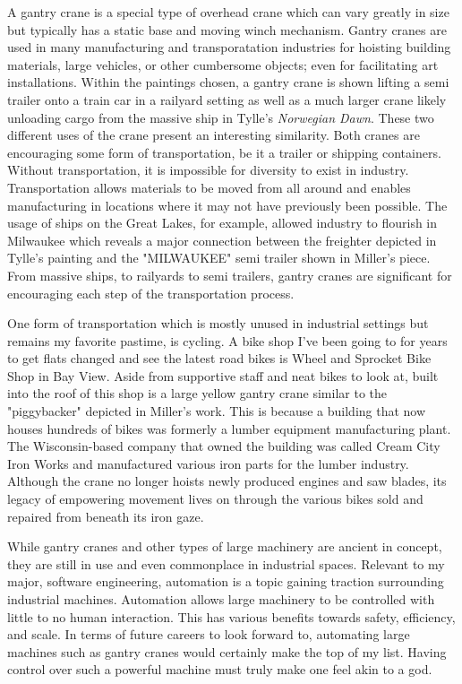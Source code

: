 \documentclass[12pt]{article}
\begin{document}
A gantry crane is a special type of overhead crane which can vary greatly in size but typically has a static base and moving winch mechanism.
Gantry cranes are used in many manufacturing and transporatation industries for hoisting building materials, large vehicles, or other cumbersome
objects; even for facilitating art installations. Within the paintings chosen, a gantry crane is shown lifting a semi trailer onto a train car
in a railyard setting as well as a much larger crane likely unloading cargo from the massive ship in Tylle's \textit{Norwegian Dawn}. These two different
uses of the crane present an interesting similarity. Both cranes are encouraging some form of transportation, be it a trailer or shipping containers. Without
transportation, it is impossible for diversity to exist in industry. Transportation allows materials to be moved from all around and enables manufacturing in
locations where it may not have previously been possible. The usage of ships on the Great Lakes, for example, allowed industry to flourish in Milwaukee which
reveals a major connection between the freighter depicted in Tylle's painting and the "MILWAUKEE" semi trailer shown in Miller's piece. From massive ships, to
railyards to semi trailers, gantry cranes are significant for encouraging each step of the transportation process. 

One form of transportation which is mostly unused in industrial settings but remains my favorite pastime, is cycling. A bike shop I've been going to for
years to get flats changed and see the latest road bikes is Wheel and Sprocket Bike Shop in Bay View. Aside from supportive staff and neat bikes to look at,
built into the roof of this shop is a large yellow
gantry crane similar to the "piggybacker" depicted in Miller's work. This is because a building that now houses hundreds of bikes was formerly a lumber equipment manufacturing plant. The Wisconsin-based company that owned the building was called Cream City Iron Works and 
manufactured various iron parts for the lumber industry. Although the crane no longer hoists newly produced engines and saw blades, its legacy of empowering
movement lives on through the various bikes sold and repaired from beneath its iron gaze. 

While gantry cranes and other types of large machinery are ancient in concept, they are still in use and even commonplace in industrial spaces. Relevant to my major,
software engineering, automation is a topic gaining traction surrounding industrial machines. Automation allows large machinery to be controlled with little to no 
human interaction. This has various benefits towards safety, efficiency, and scale. In terms of future careers to look forward to, automating large machines such
as gantry cranes would certainly make the top of my list. Having control over such a powerful machine must truly make one feel akin to a god.
\end{document}
